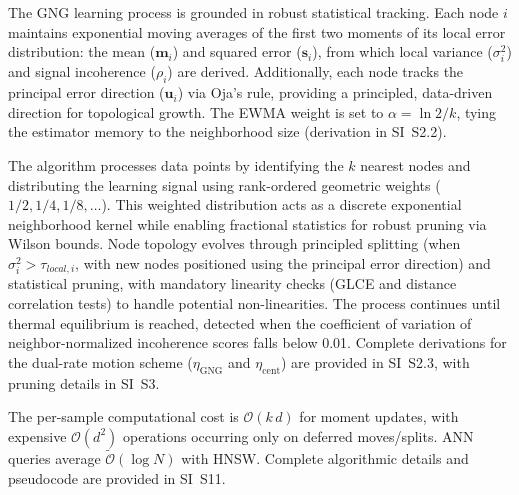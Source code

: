 \documentclass[11pt]{article}
\begin{document}
The GNG learning process is grounded in robust statistical tracking. Each node $i$ maintains exponential moving averages of the first two moments of its local error distribution: the mean ($\mathbf m_i$) and squared error ($\mathbf s_i$), from which local variance ($\sigma_i^2$) and signal incoherence ($\rho_i$) are derived. Additionally, each node tracks the principal error direction ($\mathbf u_i$) via Oja's rule, providing a principled, data-driven direction for topological growth. The EWMA weight is set to $\alpha = \ln 2/k$, tying the estimator memory to the neighborhood size (derivation in SI~S2.2). 

The algorithm processes data points by identifying the $k$ nearest nodes and distributing the learning signal using rank-ordered geometric weights ($1/2, 1/4, 1/8, \ldots$). This weighted distribution acts as a discrete exponential neighborhood kernel while enabling fractional statistics for robust pruning via Wilson bounds. Node topology evolves through principled splitting (when $\sigma_i^2 > \tau_{local,i}$, with new nodes positioned using the principal error direction) and statistical pruning, with mandatory linearity checks (GLCE and distance correlation tests) to handle potential non-linearities. The process continues until thermal equilibrium is reached, detected when the coefficient of variation of neighbor-normalized incoherence scores falls below 0.01. Complete derivations for the dual-rate motion scheme ($\eta_{\mathrm{GNG}}$ and $\eta_{\mathrm{cent}}$) are provided in SI~S2.3, with pruning details in SI~S3.

The per-sample computational cost is $\mathcal O(k\,d)$ for moment updates, with expensive $\mathcal O(d^2)$ operations occurring only on deferred moves/splits. ANN queries average $\tilde{\mathcal O}(\log N)$ with HNSW. Complete algorithmic details and pseudocode are provided in SI~S11.
\end{document}
